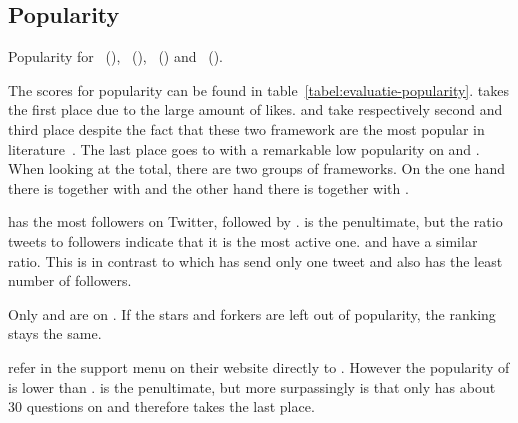 \documentclass[a4paper]{artikel3}
\begin{document}
\subsection{Popularity} %
\label{sec:evaluation-popularity}

\begin{table}[t]
\centering
\resizebox{\columnwidth}{!} {
}
\caption{Popularity for \st{}~(\sta), \kendo{}~(\kendoa), \jqm{}~(\jqma) and \lungo{}~(\lungoa).}
\label{tabel:evaluatie-popularity}
\end{table}

The scores for popularity can be found in table~\ref{tabel:evaluatie-popularity}. 
\kendob{} takes the first place due to the large amount of \fb{} likes.
\jqma{} and \sta{} take respectively second and third place despite the fact that these two framework are the most popular in literature~\cite{David2011,Firtman2013,Hales2012,Oeflman2011}. 
The last place goes to \lungo{} with a remarkable low popularity on \so{} and \fb.
When looking at the total, there are two groups of frameworks.
On the one hand there is \kendob{} together with \jqma{} and the other hand there is \sta{} together with \lungo{}.

\jqma{} has the most followers on Twitter, followed by \kendob.
\lungo{} is the penultimate, but the ratio tweets to followers indicate that it is the most active one. 
\jqma{} and \kendob{} have a similar ratio.
This is in contrast to \sta{} which has send only one tweet and also has the least number of followers. 

Only \jqma{} and \lungo{} are on \gh{}. 
If the \gh{} stars and \gh{} forkers are left out of popularity, the ranking stays the same.

\kendob{} refer in the support menu on their website directly to \so{}. 
However the popularity of \kendob{} is lower than \jqma{}.
\sta{} is the penultimate, but more surpassingly is that \lungo{} only has about 30 questions on \so{} and therefore takes the last place.
\end{document}
